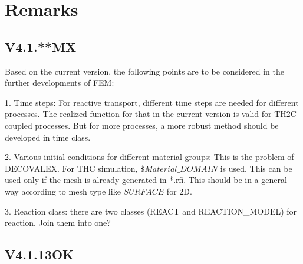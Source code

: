 \section{Remarks}

\subsection{V4.1.**MX}

Based on the current version, the following points are to be
considered in the further developments of FEM:

1. Time steps: For reactive transport, different time steps are
needed for different processes. The realized function for that in
the current version is valid for TH2C coupled processes. But for
more processes, a more robust method should be developed in time
class.

2. Various initial conditions for different material groups: This
is the problem of DECOVALEX. For THC simulation,
$\$Material\_DOMAIN$ is used. This can be used only if the mesh is
already generated in *.rfi. This should be in a general way
according to mesh type like $SURFACE$ for 2D.

3. Reaction class: there are two classes (REACT and
REACTION\_MODEL) for reaction. Join them into one?

\subsection{V4.1.13OK}

